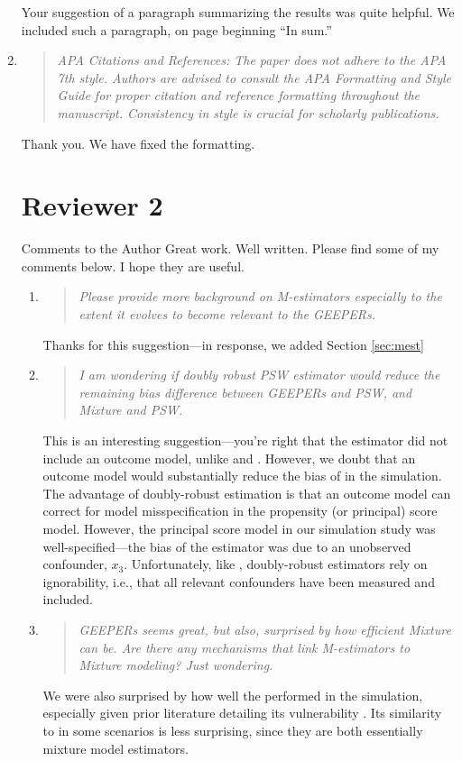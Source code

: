 \documentclass[]{article}
\newenvironment{itquote}
  {\begin{quote} \itshape}
  {\end{quote}\ignorespacesafterend}
\begin{document}
\begin{enumerate}
Your suggestion of a paragraph summarizing the results was quite helpful. We included such a paragraph, on page \pageref{simsum} beginning ``In sum.''

\item \begin{itquote}      APA Citations and References: The paper does not adhere to the APA 7th style. Authors are advised to consult the APA Formatting and Style Guide for proper citation and reference formatting throughout the manuscript. Consistency in style is crucial for scholarly publications.
\end{itquote}
Thank you. We have fixed the formatting.

\section*{Reviewer 2}
Comments to the Author
Great work. Well written. Please find some of my comments below. I hope they are useful.

\begin{enumerate}

\item \begin{itquote}   Please provide more background on M-estimators especially to the extent it evolves to become relevant to the GEEPERs. 
\end{itquote}
Thanks for this suggestion---in response, we added Section \ref{sec:mest}
\item \begin{itquote}      I am wondering if doubly robust PSW estimator would reduce the remaining bias difference between GEEPERs and PSW, and Mixture and PSW.
\end{itquote}
This is an interesting suggestion---you're right that the \psw estimator did not include an outcome model, unlike \geepers and \pmm. However, we doubt that an outcome model would substantially reduce the bias of \psw in the simulation. The advantage of doubly-robust estimation is that an outcome model can correct for model misspecification in the propensity (or principal) score model. However, the principal score model in our simulation study was well-specified---the bias of the \psw estimator was due to an unobserved confounder, $x_3$. Unfortunately, like \psw, doubly-robust estimators rely on ignorability, i.e., that all relevant confounders have been measured and included. 
\item \begin{itquote}      GEEPERs seems great, but also, surprised by how efficient Mixture can be. Are there any mechanisms that link M-estimators to Mixture modeling? Just wondering.
\end{itquote}
We were also surprised by how well the \pmm performed in the simulation, especially given prior literature detailing its vulnerability \citep[][; cited in the paper]{griffin2008application,feller2016principal}. Its similarity to \geepers in some scenarios is less surprising, since they are both essentially mixture model estimators.


\end{enumerate}
\end{enumerate}
\end{document}
